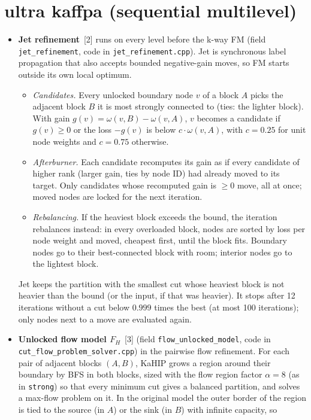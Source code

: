 \documentclass[10pt]{article}
\newcommand{\cfg}[1]{\texttt{#1}}
\begin{document}
\section{ultra kaffpa (sequential multilevel)}
\begin{itemize}
  \item \textbf{Jet refinement}~[2] runs on every level before the k-way FM
  (field \cfg{jet\_refinement}, code in \cfg{jet\_refinement.cpp}). Jet is synchronous label
  propagation that also accepts bounded negative-gain moves, so FM starts outside its own local optimum.
  \begin{itemize}
    \item \emph{Candidates.} Every unlocked boundary node $v$ of a block $A$ picks the adjacent block $B$ it is most
    strongly connected to (ties: the lighter block). With gain $g(v)=\omega(v,B)-\omega(v,A)$, $v$ becomes a
    candidate if $g(v)\ge 0$ or the loss $-g(v)$ is below $c\cdot\omega(v,A)$, with $c=0.25$ for unit
    node weights and $c=0.75$ otherwise.
    \item \emph{Afterburner.} Each candidate recomputes its gain as if every candidate of higher rank (larger
    gain, ties by node ID) had already moved to its target. Only candidates whose recomputed gain is $\ge 0$
    move, all at once; moved nodes are locked for the next iteration.
    \item \emph{Rebalancing.} If the heaviest block exceeds the bound, the iteration rebalances instead: in every
    overloaded block, nodes are sorted by loss per node weight and moved, cheapest first, until the block fits.
    Boundary nodes go to their best-connected block with room; interior nodes go to the lightest block.
  \end{itemize}
  Jet keeps the partition with the smallest cut whose heaviest block is not heavier than the bound (or the input,
  if that was heavier). It stops after 12 iterations without a cut below $0.999$ times the best (at most 100
  iterations); only nodes next to a move are evaluated again.
  \item \textbf{Unlocked flow model $F_H$}~[3] (field \cfg{flow\_unlocked\_model}, code in
  \cfg{cut\_flow\_problem\_solver.cpp}) in the pairwise flow refinement. For each pair of adjacent blocks $(A,B)$, KaHIP grows a region around
  their boundary by BFS in both blocks, sized with the flow region factor $\alpha=8$ (as in \cfg{strong}) so
  that every minimum cut gives a balanced partition, and solves a max-flow problem on it. In the original model
  the outer border of the region is tied to the source (in $A$) or the sink (in $B$) with infinite capacity, so

\end{itemize}
\end{document}
